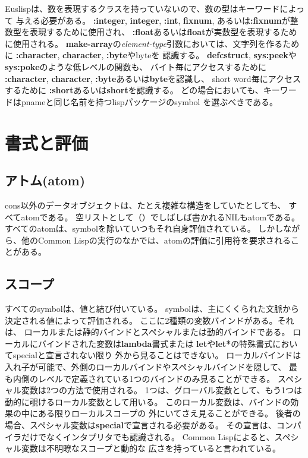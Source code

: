 Euslispは、数を表現するクラスを持っていないので、数の型はキーワードによって
与える必要がある。
{\bf :integer}, {\bf integer}, {\bf :int}, {\bf fixnum},
あるいは{\bf :fixnum}が整数型を表現するために使用され、
{\bf :float}あるいは{\bf float}が実数型を表現するために使用される。
{\bf make-array}の{\em element-type}引数においては、文字列を作るために
{\bf :character}, {\bf character}, {\bf :byte}や{\bfx byte}を
認識する。
{\bf defcstruct}, {\bf sys:peek}や{\bf sys:poke}のような低レベルの関数も、
バイト毎にアクセスするために
{\bf :character}, {\bf character}, {\bf :byte}あるいは{\bf byte}を認識し、
short word毎にアクセスするために
{\bf :short}あるいは{\bf short}を認識する。
どの場合においても、キーワードはpnameと同じ名前を持つlispパッケージのsymbol
を選ぶべきである。

\newpage

\section{書式と評価}
\subsection{アトム(atom)}

cons以外のデータオブジェクトは、たとえ複雑な構造をしていたとしても、
すべてatomである。
空リストとして（）でしばしば書かれるNILもatomである。
すべてのatomは、symbolを除いていつもそれ自身評価されている。
しかしながら、他のCommon Lispの実行のなかでは、atomの評価に引用符を要求されることがある。

\subsection{スコープ}

すべてのsymbolは、値と結び付いている。
symbolは、主にくくられた文脈から決定される値によって評価される。
ここに2種類の変数バインドがある。それは、
ローカルまたは静的バインドとスペシャルまたは動的バインドである。
ローカルにバインドされた変数は{\bf lambda}書式または
{\bf let}や{\bf let*}の特殊書式においてspecialと宣言されない限り
外から見ることはできない。
ローカルバインドは入れ子が可能で、外側のローカルバインドやスペシャルバインドを隠して、
最も内側のレベルで定義されている1つのバインドのみ見ることができる。
スペシャル変数は2つの方法で使用される。
1つは、グローバル変数として、もう1つは動的に覗けるローカル変数として用いる。
このローカル変数は、バインドの効果の中にある限りローカルスコープの
外にいてさえ見ることができる。
後者の場合、スペシャル変数は{\bf special}で宣言される必要がある。
その宣言は、コンパイラだけでなくインタプリタでも認識される。
Common Lispによると、スペシャル変数は不明瞭なスコープと動的な
広さを持っていると言われている。

